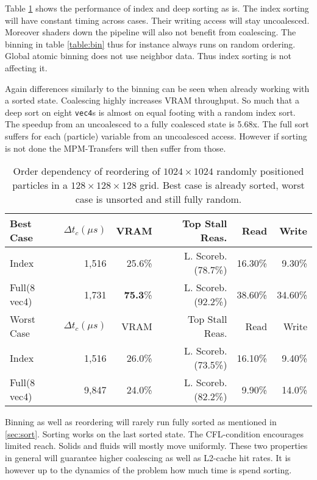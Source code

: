 \documentclass[m,times]{cgMA}
\begin{document}
Table \ref{table:sort} shows the performance of index and deep sorting as is. The index sorting will have constant timing across cases. Their writing access will stay uncoalesced. Moreover shaders down the pipeline will also not benefit from coalescing. The binning in table \ref{table:bin} thus for instance always runs on random ordering. Global atomic binning does not use neighbor data. Thus index sorting is not affecting it.

Again differences similarly to the binning can be seen when already working with a sorted state. Coalescing highly increases VRAM throughput. So much that a deep sort on eight \texttt{vec4}s is almost on equal footing with a random index sort. The speedup from an uncoalesced to a fully coalesced state is 5.68x. The full sort suffers for each (particle) variable from an uncoalesced access. However if sorting is not done the MPM-Transfers will then suffer from those.

\begin{table}[htpb]
  \begin{tabular}{ | l | r | r | r | r | r| }    \hline
    Best Case    &  $\Delta t_c (\mu s)$&VRAM  & Top Stall Reas.    & Read   & Write  \\\hline
    Index        &  1,516       &25.6\%& L. Scoreb.(78.7\%) & 16.30\%& 9.30\% \\\hline
    Full(8 vec4) &  1,731       &\textbf{75.3}\%& L. Scoreb.(92.2\%) & 38.60\%& 34.60\%\\
    \hline
    \hline
    Worst Case             &  $\Delta t_c(\mu s)$         &VRAM              & Top Stall Reas.    & Read   & Write\\\hline
    Index                  &  1,516                &26.0\%            & L. Scoreb.(73.5\%) & 16.10\%& 9.40\%\\\hline
    Full(8 vec4)           &  9,847                &24.0\%            & L. Scoreb.(82.2\%) & 9.90\% & 14.0\%\\
    \hline
 \end{tabular}
\caption{Order dependency of reordering of $1024\times1024$ randomly positioned particles in a $128\times128\times128$ grid. Best case is already sorted, worst case is unsorted and still fully random.}\label{table:sort}
\end{table}

Binning as well as reordering will rarely run fully sorted as mentioned in \ref{sec:sort}. Sorting works on the last sorted state. The CFL-condition encourages limited reach. Solids and fluids will mostly move uniformly. These two properties in general will guarantee higher coalescing as well as L2-cache hit rates. It is however up to the dynamics of the problem how much time is spend sorting.
\\
\end{document}
